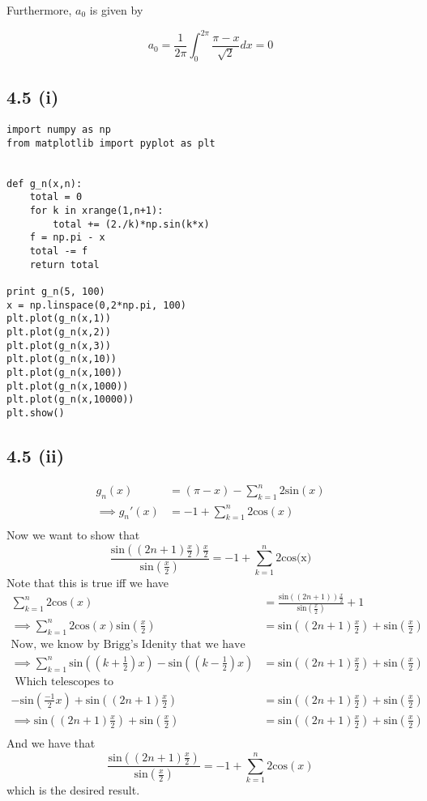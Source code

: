 \documentclass[letterpaper,12pt]{article}
\theoremstyle{definition}
\begin{document}
Furthermore, $a_0$ is given by

\[a_0 = \frac{1}{2\pi} \int^{2  \pi}_{0} \frac{\pi - x}{\sqrt 2} dx = 0\]

\subsection*{4.5 (i)}
\begin{lstlisting}
import numpy as np
from matplotlib import pyplot as plt


def g_n(x,n):
    total = 0
    for k in xrange(1,n+1):
        total += (2./k)*np.sin(k*x)
    f = np.pi - x
    total -= f
    return total

print g_n(5, 100)
x = np.linspace(0,2*np.pi, 100)
plt.plot(g_n(x,1))
plt.plot(g_n(x,2))
plt.plot(g_n(x,3))
plt.plot(g_n(x,10))
plt.plot(g_n(x,100))
plt.plot(g_n(x,1000))
plt.plot(g_n(x,10000))
plt.show()
\end{lstlisting}

\subsection*{4.5 (ii)}
\begin{align*}
    g_n(x) &= (\pi - x) - \sum^{n}_{k=1} 2 \text{sin}(x) \\
    \implies g_n'(x) &= -1 + \sum^{n}_{k=1} 2 \text{cos}(x) \\
\end{align*}
Now we want to show that 
\[\frac{\text{sin} \left( (2n+1)\frac{x}{2} \right)\frac{x}{2} }{\text{sin} (\frac{x}{2}) }  =-1 + \sum^{n}_{k=1} 2 \text{cos(x)}\]
Note that this is true iff we have
\begin{align*}
     \sum^{n}_{k=1} 2 \text{cos}(x) & = \frac{\text{sin} \left( (2n+1) \right)\frac{x}{2} }{\text{sin} (\frac{x}{2}) } +1 \\
     \implies \sum^{n}_{k=1} 2 \text{cos}(x) \text{sin}(\frac{x}{2}) & = \text{sin}( (2n+1) \frac{x}{2}) + \text{sin}(\frac{x}{2}) \\
     \text{Now, we know by Brigg's Idenity that we have}& \\
     \implies \sum^n_{k=1} \text{sin}( (k+\frac{1}{2})x) - \text{sin}( (k-\frac{1}{2})x) & =\text{sin}( (2n+1) \frac{x}{2}) + \text{sin}(\frac{x}{2}) \\
     \text{ Which telescopes to}& \\
     - \text{sin}(\frac{-1}{2}x)+ \text{sin}( (2n+1) \frac{x}{2}) & = \text{sin}( (2n+1) \frac{x}{2}) + \text{sin}(\frac{x}{2}) \\
     \implies \text{sin}( (2n+1) \frac{x}{2}) + \text{sin}(\frac{x}{2}) & = \text{sin}( (2n+1) \frac{x}{2}) + \text{sin}(\frac{x}{2}) \\
\end{align*}
And we have that
    \[\frac{\text{sin} \left( (2n+1)\frac{x}{2} \right) }{\text{sin} (\frac{x}{2}) }  =-1 + \sum^{n}_{k=1} 2 \text{cos}(x)\]
    which is the desired result.
\end{document}
